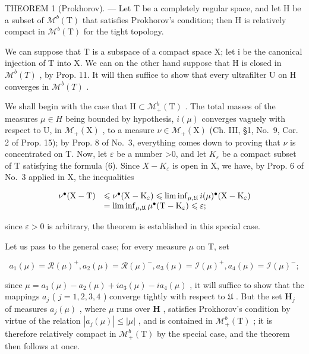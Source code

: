THEOREM 1 (Prokhorov). --- Let T be a completely regular space, and let H be a subset of \(\mathcal{M}^{b}(\mathrm{T})\) that satisfies Prokhorov's condition; then H is relatively compact in \(\mathcal{M}^{b}(\mathrm{T})\) for the tight topology.

We can suppose that T is a subspace of a compact space X; let i be the canonical injection of T into X. We can on the other hand suppose that H is closed in \(\mathcal{M}^{b}(T)\) , by Prop. 11. It will then suffice to show that every ultrafilter U on H converges in \(\mathcal{M}^{b}(T)\) .

We shall begin with the case that \(\mathrm{H}\subset\mathcal{M}_{+}^{b}(\mathrm{T})\) . The total masses of the measures \(\mu\in H\) being bounded by hypothesis, \(i(\mu)\) converges vaguely with respect to U, in \(\mathcal{M}_{+}(\mathrm{X})\) , to a measure \(\nu\in\mathcal{M}_{+}(\mathrm{X})\) (Ch. III, §1, No.~9, Cor. 2 of Prop. 15); by Prop. 8 of No.~3, everything comes down to proving that \(\nu\) is concentrated on T. Now, let \(\varepsilon\) be a number \textgreater0, and let \(K_{\varepsilon}\) be a compact subset of T satisfying the formula (6). Since \(X-K_{\varepsilon}\) is open in X, we have, by Prop. 6 of No.~3 applied in X, the inequalities

\[
\begin{array}{r l} \nu^ {\bullet} (\mathrm{X} - \mathrm{T}) & \leqslant \nu^ {\bullet} (\mathrm{X} - \mathrm{K} _ {\varepsilon}) \leqslant \liminf _ {\mu , \mathfrak {U}} i (\mu) ^ {\bullet} (\mathrm{X} - \mathrm{K} _ {\varepsilon}) \\ & = \liminf _ {\mu , \mathfrak {U}} \mu^ {\bullet} (\mathrm{T} - \mathrm{K} _ {\varepsilon}) \leqslant \varepsilon ; \end{array}
\]

since \(\varepsilon > 0\) is arbitrary, the theorem is established in this special case.

Let us pass to the general case; for every measure \(\mu\) on T, set

\[
a _ {1} (\mu) = \mathcal {R} (\mu) ^ {+}, a _ {2} (\mu) = \mathcal {R} (\mu) ^ {-}, a _ {3} (\mu) = \mathcal {I} (\mu) ^ {+}, a _ {4} (\mu) = \mathcal {I} (\mu) ^ {-};
\]

since \(\mu = a_{1}(\mu) - a_{2}(\mu) + ia_{3}(\mu) - ia_{4}(\mu)\) , it will suffice to show that the mappings \(a_{j}\) ( \(j = 1,2,3,4\) ) converge tightly with respect to \(\mathfrak{U}\) . But the set \(\mathbf{H}_j\) of measures \(a_{j}(\mu)\) , where \(\mu\) runs over \(\mathbf{H}\) , satisfies Prokhorov's condition by virtue of the relation \(|a_j(\mu)| \leqslant |\mu|\) , and is contained in \(\mathcal{M}_+^b(\mathrm{T})\) ; it is therefore relatively compact in \(\mathcal{M}_+^b(\mathrm{T})\) by the special case, and the theorem then follows at once.

